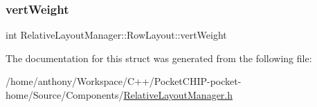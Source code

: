 \subsubsection{\texorpdfstring{vert\+Weight}{vertWeight}}
{\footnotesize\ttfamily int Relative\+Layout\+Manager\+::\+Row\+Layout\+::vert\+Weight}



The documentation for this struct was generated from the following file\+:\begin{DoxyCompactItemize}
\item 
/home/anthony/\+Workspace/\+C++/\+Pocket\+C\+H\+I\+P-\/pocket-\/home/\+Source/\+Components/\mbox{\hyperlink{RelativeLayoutManager_8h}{Relative\+Layout\+Manager.\+h}}\end{DoxyCompactItemize}
